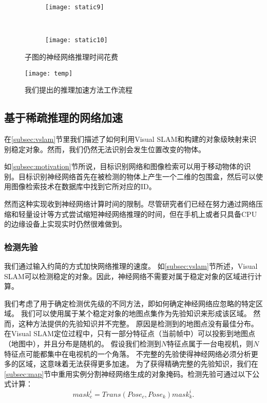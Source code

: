 \begin{figure}[t]
	\centering
	\begin{subfigure}{.48\linewidth}
		\texttt{[image: static9]}
		\caption{}
	\end{subfigure}
	\ 
	\begin{subfigure}{.48\linewidth}
		\texttt{[image: static10]}
		\caption{}
	\end{subfigure}
	\caption{子图的神经网络推理时间花费}\label{fig:subframetime}
\end{figure}


\begin{figure}[t]
	\centering
	\texttt{[image: temp]}
	\caption{我们提出的推理加速方法工作流程}
	\label{fig:sparse-conv}
\end{figure}


\subsection{基于稀疏推理的网络加速}\label{sub:Sparse Object Detection}
在\ref{subsec:vslam}节里我们描述了如何利用Visual SLAM和构建的对象级映射来识别稳定对象。然而，我们仍然无法识别会发生位置改变的物体。

如\ref{subsec:motivation}节所说，目标识别网络和图像检索可以用于移动物体的识别。目标识别神经网络首先在被检测的物体上产生一个二维的包围盒，然后可以使用图像检索技术在数据库中找到它所对应的ID。

然而这种实现收到神经网络计算时间的限制。尽管研究者们已经在努力通过网络压缩和轻量设计等方式尝试缩短神经网络推理的时间，但在手机上或者只具备CPU的边缘设备上实现实时仍然很难做到。


\subsubsection{检测先验}

我们通过输入约简的方式加快网络推理的速度。
如\ref{subsec:vslam}节所述，Visual SLAM可以检测稳定的对象。因此，神经网络不需要对属于稳定对象的区域进行计算。

我们考虑了用于确定检测优先级的不同方法，即如何确定神经网络应忽略的特定区域。
我们可以使用属于某个稳定对象的地图点集作为先验知识来形成该区域。
然而，这种方法提供的先验知识并不完整。
原因是检测到的地图点没有最佳分布。
在Visual SLAM定位过程中，只有一部分特征点（当前帧中）可以投影到地图点（地图中），并且分布是随机的。
假设我们检测到$N$特征点属于一台电视机，则$N$特征点可能都集中在电视机的一个角落。
不完整的先验使得神经网络必须分析更多的区域，这意味着无法获得更多加速。
为了获得精确完整的先验知识，我们在\ref{subsec:map}节中重用实例分割神经网络生成的对象掩码。检测先验可通过以下公式计算：
\begin{equation}\label{equ:mask}
mask_c^i = Trans(Pose_c,Pose_k)mask_k^i.
\end{equation} 

